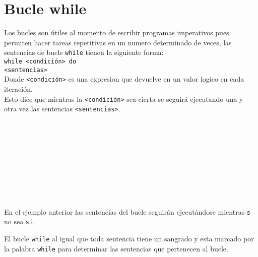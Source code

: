    \section{Bucle while}
      Los bucles son útiles al momento de escribir programas imperativos pues permiten hacer tareas repetitivas en un numero determinado de veces, las sentencias de bucle \texttt{while} tienen la siguiente forma:
      \\
      
      \texttt{while~<condición>~do}\\
      \texttt{\linetab<sentencias>}
      \\
      
      Donde \texttt{<condición>} es una expresion que devuelve en un valor logico en cada iteración.
      \\
      
      Esto dice que mientras la \texttt{<condición>} sea cierta se seguirá ejecutando una y otra vez las sentencias \texttt{<sentencias>}.
      
      \begin{fxcode}
         \\
         \\
         \\
         \\
         \\
         \\
         \\
         \\
      \end{fxcode}
      
      En el ejemplo anterior las sentencias del bucle seguirán ejecutándose mientras \texttt{s} no sea \texttt{\textquotedbl si\textquotedbl}.
      
      El bucle \texttt{while} al igual que toda sentencia tiene un sangrado y esta marcado por la palabra \texttt{while} para determinar las sentencias que pertenecen al bucle.
      
